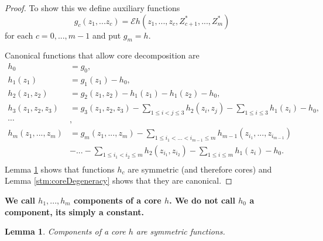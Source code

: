 \documentclass{article} %
\newtheorem{lemma}{Lemma}
\newcommand{\ev}{\mathcal{E}}
\begin{document}
\begin{proof}
To show this we define auxiliary functions
\[
 g_c(z_1,...z_c) = \ev h(z_1,...,z_c,Z_{c+1}^*,...,Z_{m}^*)
\]
for each $c=0,...,m-1$ and put $g_m=h$.  

Canonical functions that allow core decomposition are 
\begin{align}
   h_0 &= g_0, \\  
   h_1(z_1) &= g_1(z_1) -h_0,\\
   h_2(z_1,z_2) &= g_2(z_1,z_2)  - h_1(z_1) - h_1(z_2)-h_0, \\  
   h_3(z_1,z_2,z_3) &= g_3(z_1,z_2,z_3) - \sum_{1 \leq i < j \leq 3 } h_2(z_i,z_j) - \sum_{1\leq i \leq 3} h_1(z_i)-h_0, \\ 
   \cdots &, \\
   h_m(z_1,...,z_m) &= g_m(z_1,...,z_m) - \sum_{1 \leq i_1 < ...<i_{m-1} \leq m } h_{m-1}(z_{i_1},...,z_{i_{m-1}}) \\ 
    & - ... - \sum_{1 \leq i_1 < i_2 \leq m } h_2(z_{i_1},z_{i_2}) - \sum_{1 \leq i \leq m} h_1(z_i)-h_0.\\
\end{align}
Lemma \ref{lem:symetric} shows that functions $h_c$ are symmetric (and therefore cores) and Lemma \ref{stm:coreDegeneracy} shows that they are canonical.  
\end{proof}

\textbf{ We call $h_1,...,h_m$ components of a core $h$. We do not call $h_0$ a component, its simply a constant.}
 
 
 
 
\begin{lemma}\cite[Section 5.1.5]{serfling80}
\label{lem:symetric}
Components of a core $h$ are symmetric functions.
\end{lemma}
\end{document}
